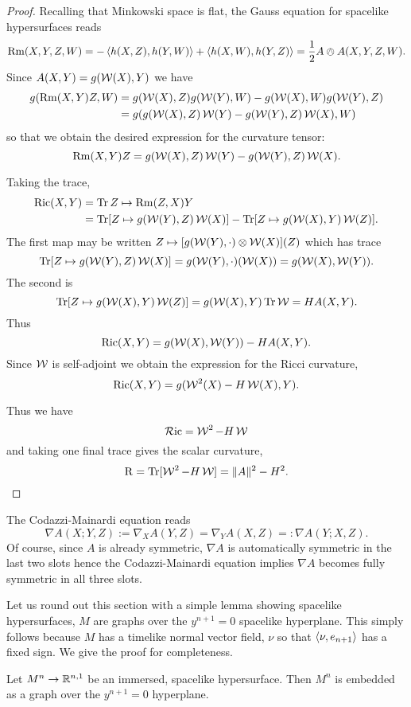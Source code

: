 \documentclass[a4paper, 12pt]{amsart}
\begin{document}
\begin{proof}
Recalling that Minkowski space is flat, the Gauss equation for spacelike hypersurfaces reads
\[
\Rm(X, Y, Z, W) = -\inpr{h(X, Z)}{h(Y, W)} + \inpr{h(X, W)}{h(Y, Z)} = \frac{1}{2} A \owedge A (X, Y, Z, W).
\]
Since \(A(X, Y) = g(\W(X), Y)\) we have
\begin{align*}
g(\Rm(X, Y) Z, W) &= g(\W(X), Z) g(\W(Y), W) - g(\W(X), W) g(\W(Y), Z) \\
&= g(g(\W(X), Z) \W(Y) - g(\W(Y), Z) \W(X), W)
\end{align*}
so that we obtain the desired expression for the curvature tensor:
\[
\Rm(X, Y) Z = g(\W(X), Z) \W(Y) - g(\W(Y), Z) \W(X).
\]

Taking the trace,
\[
\begin{split}
\Ric(X, Y) &= \Tr Z \mapsto \Rm(Z, X) Y \\
&= \Tr [Z \mapsto g(\W(Y), Z) \W(X)] - \Tr[Z \mapsto g(\W(X), Y) \W(Z)].
\end{split}
\]
The first map may be written \(Z \mapsto [g(\W(Y), \cdot) \otimes \W(X)] (Z)\) which has trace
\[
\Tr [Z \mapsto g(\W(Y), Z) \W(X)] = g(\W(Y), \cdot) (\W(X)) = g(\W(X), \W(Y)).
\]
The second is
\[
\Tr [Z \mapsto g(\W(X), Y) \W(Z)] = g(\W(X), Y) \Tr \W = H A(X, Y).
\]
Thus
\[
\Ric(X, Y) = g(\W(X),\W(Y)) - H A(X, Y).
\]
Since \(\W\) is self-adjoint we obtain the expression for the Ricci curvature,
\[
\Ric(X, Y) = g(\W^2(X) - H \W(X), Y).
\]

Thus we have
\[
\opRic = \W^2 - H\W
\]
and taking one final trace gives the scalar curvature,
\[
\Sc = \Tr [\W^2 - H\W] = \|A\|^2 - H^2.
\]
\end{proof}


The Codazzi-Mainardi equation reads
\begin{equation}
\label{eq:codazzi}
\nabla A (X; Y, Z) := \nabla_X A (Y, Z) = \nabla_Y A(X, Z) =: \nabla A(Y; X, Z).
\end{equation}
Of course, since \(A\) is already symmetric, \(\nabla A\) is automatically symmetric in the last two slots hence the Codazzi-Mainardi equation implies \(\nabla A\) becomes fully symmetric in all three slots.

Let us round out this section with a simple lemma showing spacelike hypersurfaces, \(M\) are graphs over the \(y^{n+1} = 0\) spacelike hyperplane. This simply follows because \(M\) has a timelike normal vector field, \(\nu\) so that \(\inpr{\nu}{e_{n+1}}\) has a fixed sign. We give the proof for completeness.

\begin{lemma}
\label{lem:graph}

Let \(M^n \to \R^{n,1}\) be an immersed, spacelike hypersurface. Then \(M^n\) is embedded as a graph over the \(y^{n+1} = 0\) hyperplane.
\end{lemma}
\end{document}
